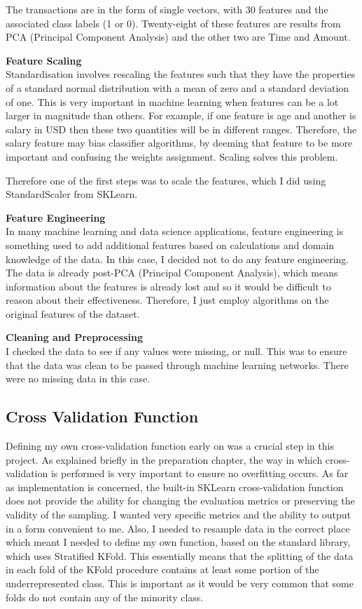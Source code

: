\documentclass[12pt,a4paper,twoside]{report}
\begin{document}
The transactions are in the form of single vectors, with 30 features and the associated class labels (1 or 0). Twenty-eight of these features are results from PCA (Principal Component Analysis) and the other two are Time and Amount. 

\textbf{Feature Scaling}\\

Standardisation involves rescaling the features such that they have the properties of a standard normal distribution with a mean of zero and a standard deviation of one. This is very important in machine learning when features can be a lot larger in magnitude than others. For example, if one feature is age and another is salary in USD then these two quantities will be in different ranges. Therefore, the salary feature may bias classifier algorithms, by deeming that feature to be more important and confusing the weights assignment. Scaling solves this problem. 

Therefore one of the first steps was to scale the features, which I did using StandardScaler from SKLearn. 

\textbf{Feature Engineering}\\

In many machine learning and data science applications, feature engineering is something used to add additional features based on calculations and domain knowledge of the data. In this case, I decided not to do any feature engineering. The data is already post-PCA (Principal Component Analysis), which means information about the features is already lost and so it would be difficult to reason about their effectiveness. Therefore, I just employ algorithms on the original features of the dataset.

\textbf{Cleaning and Preprocessing}\\

I checked the data to see if any values were missing, or null. This was to ensure that the data was clean to be passed through machine learning networks. There were no missing data in this case.

\subsection{Cross Validation Function}

Defining my own cross-validation function early on was a crucial step in this project. As explained briefly in the preparation chapter, the way in which cross-validation is performed is very important to ensure no overfitting occurs. As far as implementation is concerned, the built-in SKLearn cross-validation function does not provide the ability for changing the evaluation metrics or preserving the validity of the sampling. I wanted very specific metrics and the ability to output in a form convenient to me. Also, I needed to resample data in the correct place which meant I needed to define my own function, based on the standard library, which uses Stratified KFold. This essentially means that the splitting of the data in each fold of the KFold procedure contains at least some portion of the underrepresented class. This is important as it would be very common that some folds do not contain any of the minority class. 
\end{document}
